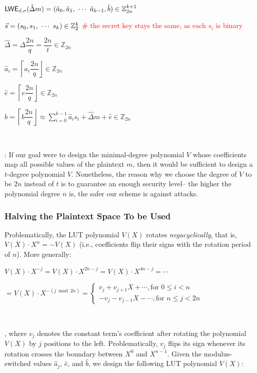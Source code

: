 $ $

$\textsf{LWE}_{\vec{s}, \sigma}(\hat{\Delta} m) = (\hat{a}_0, \hat{a}_1, \text{ } \text{$\cdots$} \text{ } \hat{a}_{k-1}, \hat{b}) \in \mathbb{Z}_{2n}^{k+1}$

$\vec{s} = (s_0, s_1, \text{ } \text{$\cdots$} \text{ } s_k) \in \mathbb{Z}_2^{k}$  \textcolor{red}{\# the secret key stays the same, as each $s_i$ is binary}

$\hat{\Delta} = \Delta\dfrac{2n}{q} = \dfrac{2n}{t} \in \mathbb{Z}_{2n}$

$\hat{a}_i = \left \lceil a_i\dfrac{2n}{q} \right \rfloor \in \mathbb{Z}_{2n}$

$\hat{e} = \left \lceil e\dfrac{2n}{q} \right \rfloor \in \mathbb{Z}_{2n}$

$\hat{b} = \left \lceil b\dfrac{2n}{q} \right \rfloor \approx \sum\limits_{i=0}^{k-1} \hat{a}_is_i + \hat{\Delta} m + \hat{e}  \in \mathbb{Z}_{2n}$



$ $

: If our goal were to design the minimal-degree polynomial $V$ whose coefficients map all possible values of the plaintext $m$, then it would be sufficient to design a ${t}$-degree polynomial $V$. Nonetheless, the reason why we choose the degree of $V$ to be $2n$ instead of ${t}$ is to guarantee an enough security level-- the higher the polynomial degree $n$ is, the safer our scheme is against attacks. 



\subsubsection{Halving the Plaintext Space To be Used}
\label{subsec:tfhe-zero-padding} 

Problematically, the LUT polynomial $V(X)$  rotates \textit{negacyclically}, that is, $V(X)\cdot X^{n} = -V(X)$ (i.e., coefficients flip their signs with the rotation period of $n$). More generally:


$V(X)\cdot X^{-j}= V(X)\cdot X^{2n - j} = V(X)\cdot X^{4n - j} = \cdots$


$
= V(X)\cdot X^{-(j \bmod 2n)} =  
\begin{cases}
    v_j  + v_{j+1}X + \cdots, \text{for } 0\leq i<n\\
    -v_{j} - v_{j-1}X - \cdots, \text{for } n\leq j<2n
\end{cases}
$

$ $

\noindent , where $v_j$ denotes the constant term's coefficient after rotating the polynomial $V(X)$ by $j$ positions to the left. Problematically, $v_j$ flips its sign whenever its rotation crosses the boundary between $X^0$ and $X^{n-1}$. Given the modulus-switched values $\hat{a}_j$, $\hat{e}$, and $\hat{b}$, we design the following LUT polynomial $V(X)$:

